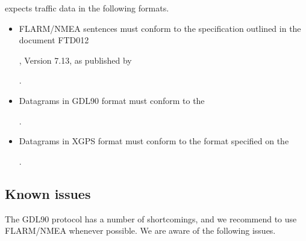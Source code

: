 \documentclass[letterpaper,10pt,english]{sphinxmanual}
\begin{document}
\sphinxAtStartPar
{} expects traffic data in the following formats.
\begin{itemize}
\item {} 
\sphinxAtStartPar
FLARM/NMEA sentences must conform to the specification outlined in the
document FTD\sphinxhyphen{}012 %
\begin{footnote}[86]\sphinxAtStartFootnote
{}
%
\end{footnote}, Version 7.13, as published
by %
\begin{footnote}[87]\sphinxAtStartFootnote
{}
%
\end{footnote}.

\item {} 
\sphinxAtStartPar
Datagrams in GDL90 format must conform to the %
\begin{footnote}[88]\sphinxAtStartFootnote
{}
%
\end{footnote}.

\item {} 
\sphinxAtStartPar
Datagrams in XGPS format must conform to the format specified on the
%
\begin{footnote}[89]\sphinxAtStartFootnote
{}
%
\end{footnote}.

\end{itemize}


\subsection{Known issues}
\label{\detokenize{04-appendix/technical:known-issues}}
\sphinxAtStartPar
The GDL90 protocol has a number of shortcomings, and we recommend to use
FLARM/NMEA whenever possible.  We are aware of the following issues.
\end{document}
